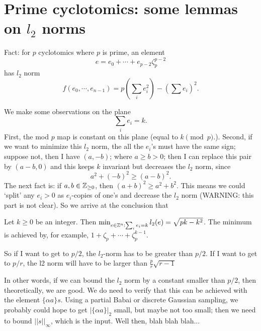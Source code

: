\documentclass{amsart}
\begin{document}
\section{Prime cyclotomics: some lemmas on $l_2$ norms}

Fact: for $p$ cyclotomics where $p$ is prime, an element
\[
    e = e_0 + \cdots + e_{p-2}\zeta_p^{p-2}
\]
has $l_2$ norm
\[
    f(e_0,\cdots, e_{n-1}) = p(\sum_i e_i^2) - (\sum e_i)^2.
\]

We make some observations on the plane
\[
    \sum_i e_i = k.
\]
First, the mod $p$ map is constant on this plane (equal
to $k \pmod{p}$.). Second, if we want to minimize this $l_2$ norm, the all the $e_i$'s must have the same sign;
suppose not, then I have $(a, -b)$; where $a \geq b >0$; then I can replace this pair by $(a-b, 0)$ and this keeps $k$ invariant but decreases the $l_2$ norm, since
\[
    a^2 + (-b)^2 \geq (a-b)^2.
\]
The next fact is: if $a, b \in \mathbb{Z}_{\geq 0}$, then $(a+b)^2 \geq a^2+b^2$. This means we could `split' any $e_i > 0$ as $e_i$-copies of one's and decrease the $l_2$
norm (WARNING: this part is not clear). So we arrive at the conclusion that

\begin{Lemma}
Let $k \geq 0$ be an integer. Then $\min_{e \in \mathbb{Z}^n: \sum_i e_i = k} l_2(e) = \sqrt{pk - k^2}$. The minimum is  achieved by, for example, $1+\zeta_p + \cdots + \zeta_p^{k-1}$.
\end{Lemma}

So if I want to get to $p/2$, the $l_2$-norm has to be
greater than $p/2$. If I want to get to $p/r$, the l2 norm will have to be larger than $\frac{p}{r} \sqrt{r-1}$

In other words, if we can bound the $l_2$ norm by a constant smaller than $p/2$, then theoretically, we are good. We do need to verify that this can be achieved with
the element $\{\alpha a\} s$. Using a partial Babai or
discrete Gaussian sampling, we probably could hope to get
$|\{\alpha a\}|_2$ small, but maybe not too small; then we need to bound $||s||_\infty$, which is the input. Well then, blah blah blah...
\end{document}
